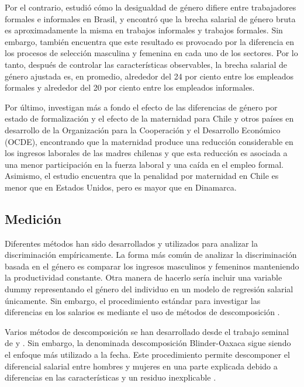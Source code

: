 Por el contrario, \citet{Yahmed2018} estudió cómo la desigualdad de género difiere entre trabajadores formales e informales en Brasil, y encontró que la brecha salarial de género bruta es aproximadamente la misma en trabajos informales y trabajos formales. Sin embargo, también encuentra que este resultado es provocado por la diferencia en los procesos de selección masculina y femenina en cada uno de los sectores. Por lo tanto, después de controlar las características observables, la brecha salarial de género ajustada es, en promedio, alrededor del 24 por ciento entre los empleados formales y alrededor del 20 por ciento entre los empleados informales.

Por último, \citet{Berniell2021} investigan más a fondo el efecto de las diferencias de género por estado de formalización y el efecto de la maternidad para Chile y otros países en desarrollo de la Organización para la Cooperación y el Desarrollo Económico (OCDE), encontrando que la maternidad produce una reducción considerable en los ingresos laborales de las madres chilenas y que esta reducción es asociada a una menor participación en la fuerza laboral y una caída en el empleo formal. Asimismo, el estudio encuentra que la penalidad por maternidad en Chile es menor que en Estados Unidos, pero es mayor que en Dinamarca.
\subsection{Medición}
Diferentes métodos han sido desarrollados y utilizados para analizar la discriminación empíricamente. La forma más común de analizar la discriminación basada en el género es comparar los ingresos masculinos y femeninos manteniendo la productividad constante. Otra manera de hacerlo sería incluir una variable dummy representando el género del individuo en un modelo de regresión salarial únicamente. Sin embargo, el procedimiento estándar para investigar las diferencias en los salarios es mediante el uso de métodos de descomposición \citep{Fortin2011,Weichselbaumer2005}.

Varios métodos de descomposición se han desarrollado desde el trabajo seminal de \citet{Oaxaca1973} y \citet{Blinder1973}. Sin embargo, la denominada descomposición Blinder-Oaxaca sigue siendo el enfoque más utilizado a la fecha. Este procedimiento permite descomponer el diferencial salarial entre hombres y mujeres en una parte explicada debido a diferencias en las características y un residuo inexplicable \citep{Fortin2011,Weichselbaumer2005}.
